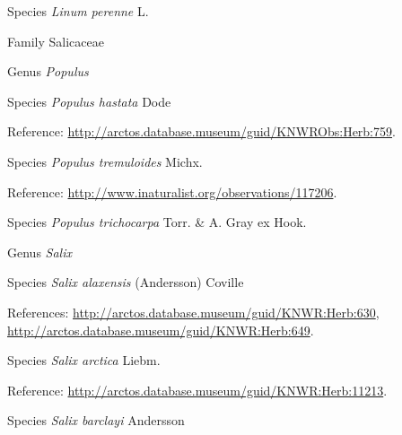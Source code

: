 \documentclass[9pt, article]{memoir}
\begin{document}
\begin{multicols}{2}
\vspace{6pt}\noindent\hspace{36pt}Species \textit{Linum perenne} L.


\vspace{6pt}\noindent\hspace{24pt}Family Salicaceae


\vspace{6pt}\noindent\hspace{30pt}Genus \textit{Populus}


\vspace{6pt}\noindent\hspace{36pt}Species \textit{Populus hastata} Dode


\vspace{6pt}Reference: 
\url{http://arctos.database.museum/guid/KNWRObs:Herb:759}.

\vspace{6pt}\noindent\hspace{36pt}Species \textit{Populus tremuloides} Michx.


\vspace{6pt}Reference: 
\url{http://www.inaturalist.org/observations/117206}.

\vspace{6pt}\noindent\hspace{36pt}Species \textit{Populus trichocarpa} Torr. \& A. Gray ex Hook.


\vspace{6pt}\noindent\hspace{30pt}Genus \textit{Salix}


\vspace{6pt}\noindent\hspace{36pt}Species \textit{Salix alaxensis} (Andersson) Coville


\vspace{6pt}References: 
\url{http://arctos.database.museum/guid/KNWR:Herb:630}, 
\url{http://arctos.database.museum/guid/KNWR:Herb:649}.

\vspace{6pt}\noindent\hspace{36pt}Species \textit{Salix arctica} Liebm.


\vspace{6pt}Reference: 
\url{http://arctos.database.museum/guid/KNWR:Herb:11213}.

\vspace{6pt}\noindent\hspace{36pt}Species \textit{Salix barclayi} Andersson



\end{multicols}
\end{document}
